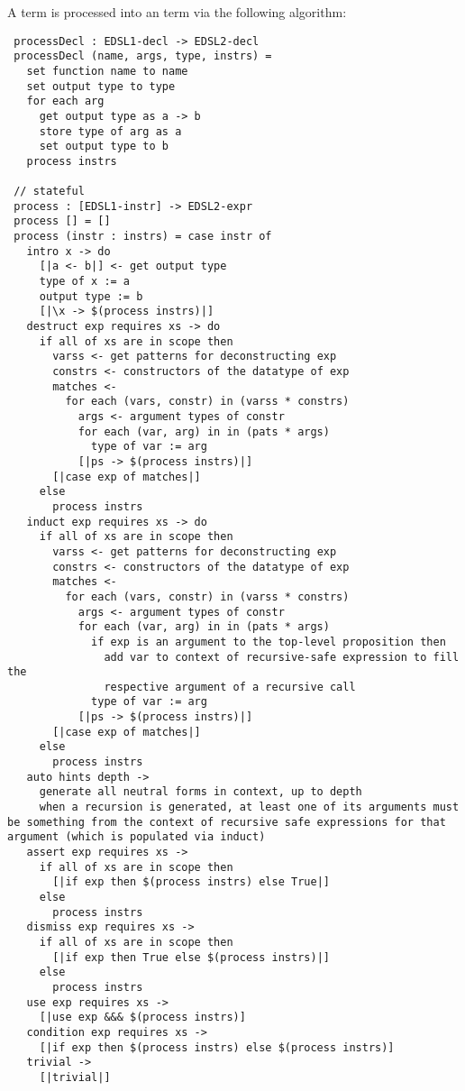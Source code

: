 A \LangA term is processed into an \LangB term via the following algorithm:
\begin{verbatim}
 processDecl : EDSL1-decl -> EDSL2-decl
 processDecl (name, args, type, instrs) =
   set function name to name
   set output type to type
   for each arg
     get output type as a -> b 
     store type of arg as a
     set output type to b
   process instrs
  
 // stateful
 process : [EDSL1-instr] -> EDSL2-expr
 process [] = []
 process (instr : instrs) = case instr of 
   intro x -> do
     [|a <- b|] <- get output type
     type of x := a
     output type := b
     [|\x -> $(process instrs)|]
   destruct exp requires xs -> do
     if all of xs are in scope then 
       varss <- get patterns for deconstructing exp
       constrs <- constructors of the datatype of exp
       matches <- 
         for each (vars, constr) in (varss * constrs)
           args <- argument types of constr
           for each (var, arg) in in (pats * args)
             type of var := arg
           [|ps -> $(process instrs)|]
       [|case exp of matches|]
     else
       process instrs
   induct exp requires xs -> do
     if all of xs are in scope then 
       varss <- get patterns for deconstructing exp
       constrs <- constructors of the datatype of exp
       matches <-
         for each (vars, constr) in (varss * constrs)
           args <- argument types of constr
           for each (var, arg) in in (pats * args)
             if exp is an argument to the top-level proposition then
               add var to context of recursive-safe expression to fill the
               respective argument of a recursive call
             type of var := arg
           [|ps -> $(process instrs)|]
       [|case exp of matches|]
     else
       process instrs
   auto hints depth ->
     generate all neutral forms in context, up to depth
     when a recursion is generated, at least one of its arguments must be something from the context of recursive safe expressions for that argument (which is populated via induct)
   assert exp requires xs ->
     if all of xs are in scope then
       [|if exp then $(process instrs) else True|]
     else
       process instrs
   dismiss exp requires xs ->
     if all of xs are in scope then
       [|if exp then True else $(process instrs)|]
     else
       process instrs
   use exp requires xs -> 
     [|use exp &&& $(process instrs)]
   condition exp requires xs ->
     [|if exp then $(process instrs) else $(process instrs)]
   trivial ->
     [|trivial|]
\end{verbatim}

